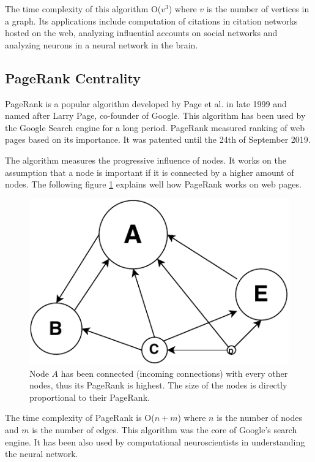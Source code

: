 \documentclass[journal,twoside,web]{ieeecolor}
\begin{document}
The time complexity of this algorithm O($v^3$) where $v$ is the number of vertices in a graph. Its applications include computation of citations in citation networks hosted on the web, analyzing influential accounts on social networks and analyzing neurons in a neural network in the brain.

\subsection{PageRank Centrality}
PageRank is a popular algorithm developed by Page et al. in late 1999 and named after Larry Page, co-founder of Google. This algorithm has been used by the Google Search engine for a long period. PageRank measured ranking of web pages based on its importance. It was patented until the 24th of September 2019.

The algorithm measures the progressive influence of nodes. It works on the assumption that a node is important if it is connected by a higher amount of nodes. The following figure \ref{fig13} explains well how PageRank works on web pages.

\begin{figure}[!h]
    \centerline{\includegraphics[scale=0.8]{figures/pagerank.pdf}}
    \caption{Node $A$ has been connected (incoming connections) with every other nodes, thus its PageRank is highest. The size of the nodes is directly proportional to their PageRank.}
    \label{fig13}
\end{figure}

The time complexity of PageRank is O($n + m$) where $n$ is the number of nodes and $m$ is the number of edges. This algorithm was the core of Google's search engine. It has been also used by computational neuroscientists in understanding the neural network.
\end{document}
